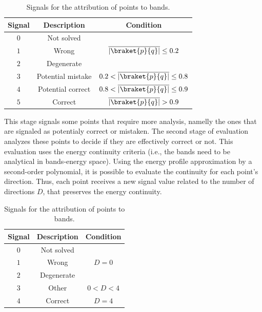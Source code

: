 \documentclass[a4paper,12pt]{report}
\begin{document}
\begin{appendices}
\begin{table}[H]
    \center
    \caption{Signals for the attribution of points to bands.}\label{tab:signals1}
    \begin{tabular}{ccc}
        \hline
        Signal & Description       & Condition                                  \\\hline
        $0$    & Not solved        &                                            \\
        $1$    & Wrong             & $\overline{\left|\braket{p}{q}\right|} \leq 0.2$        \\
        $2$    & Degenerate        &                                            \\
        $3$    & Potential mistake & $0.2 < \overline{\left|\braket{p}{q}\right|} \leq 0.8$  \\
        $4$    & Potential correct & $0.8 < \overline{\left|\braket{p}{q}\right|} \leq 0.9 $ \\
        $5$    & Correct           & $\overline{\left|\braket{p}{q}\right|} > 0.9$           \\\hline
    \end{tabular}
\end{table}

This stage signals some points that require more analysis, namelly the ones that are signaled as potentialy correct or mistaken.
The second stage of evaluation analyzes these points to decide if they are effectively correct or not.
This evaluation uses the energy continuity criteria (i.e., the bands need to be analytical in bands-energy space).
Using the energy profile approximation by a second-order polynomial, it is possible to evaluate the continuity for each point's direction.
Thus, each point receives a new signal value related to the number of directions $D$, that preserves the energy continuity.

\begin{table}[H]
    \center
    \caption{Signals for the attribution of points to bands.}\label{tab:signals2}
    \begin{tabular}{ccc}
        \hline
        Signal & Description       & Condition                                  \\\hline
        $0$    & Not solved        &                                            \\
        $1$    & Wrong             & $D=0$        \\
        $2$    & Degenerate        &                                            \\
        $3$    & Other             & $0<D<4$  \\
        $4$    & Correct           & $D = 4$           \\\hline
    \end{tabular}


\end{table}
\end{appendices}
\end{document}
